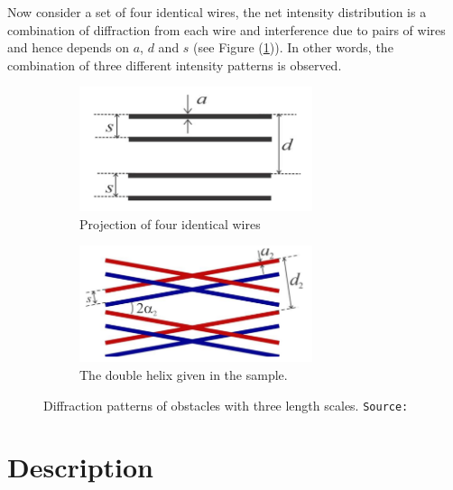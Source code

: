 \begin{refsection}
Now consider a set of four identical wires, the net intensity distribution is a combination of diffraction from each wire and interference due to pairs of wires and hence depends on $a$, $d$ and $s$ (see Figure (\ref{fig:fourwires})). In other words, the combination of three different intensity patterns is observed.

\begin{figure}[!htb]
    \centering
    \begin{subfigure}[b]{0.45\textwidth}
                \centering
                \includegraphics[width=0.75\textwidth]{figs/fourwires.png}
                \caption{Projection of four identical wires}
                \label{fig:fourwires}
        \end{subfigure}%
        \begin{subfigure}[b]{0.45\textwidth}
                \centering
                \includegraphics[width=0.75\textwidth]{figs/doublehelix-schema.png}
                \caption{The double helix given in the sample.}
                \label{fig:doublehelix2}
        \end{subfigure}
        \caption{Diffraction patterns of obstacles with three length scales. \texttt{Source:~\cite{pathak_diffraction_2015}}}
\end{figure}

\section*{Description}


\end{refsection}

